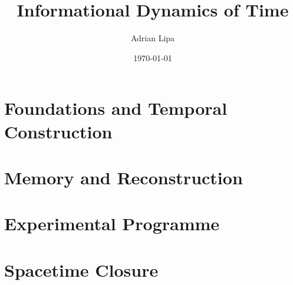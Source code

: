 \documentclass[11pt]{book}
\title{Informational Dynamics of Time}
\author{Adrian Lipa}
\date{\today}
\begin{document}
\frontmatter
\maketitle




\tableofcontents
\mainmatter
\part{Foundations and Temporal Construction}










\part{Memory and Reconstruction}
















\part{Experimental Programme}


\part{Spacetime Closure}




\appendix

\backmatter

\end{document}
